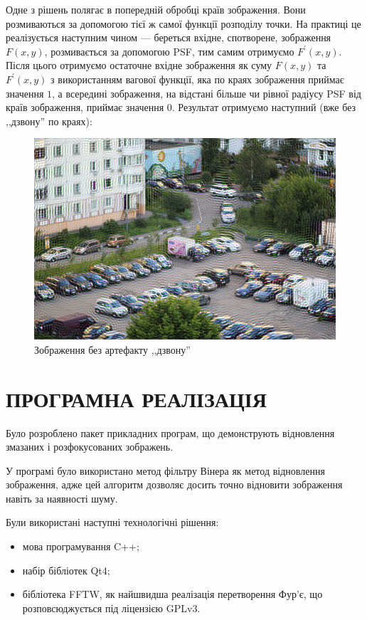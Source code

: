 \documentclass{diploma}
\begin{document}
    Одне з рішень полягає в попередній обробці країв зображення.
    Вони розмиваються за допомогою тієї ж самої функції розподілу точки.
    На практиці це реалізується наступним чином --- береться вхідне,
    спотворене, зображення $F\left( x, y \right)$, розмивається за допомогою
    PSF, тим самим отримуємо $F^\prime\left( x, y \right)$.
    Після цього отримуємо остаточне вхідне зображення як суму $F\left( x, y
    \right)$ та $F^\prime\left( x, y \right)$ з використанням вагової функції,
    яка по краях зображення приймає значення $1$, а всередині зображення,
    на відстані більше чи рівної радіусу PSF від країв зображення, приймає
    значення $0$.
    Результат отримуємо наступний (вже без ,,дзвону'' по краях):
    \begin{figure}[h]
      \centering
      \includegraphics[width=\linewidth]{edge-fixed.jpg}
      \caption{Зображення без артефакту ,,дзвону''}
      \label{fig:edge-fixed}
    \end{figure}

\chapter{ПРОГРАМНА РЕАЛІЗАЦІЯ}
  Було розроблено пакет прикладних програм, що демонструють відновлення
  змазаних і розфокусованих зображень.

  У програмі було використано метод фільтру Вінера як метод відновлення
  зображення, адже цей алгоритм дозволяє досить точно відновити зображення
  навіть за наявності шуму.

  Були використані наступні технологічні рішення:
  \begin{itemize}
    \item мова програмування C++;
    \item набір бібліотек Qt4;
    \item бібліотека FFTW, як найшвидша реалізація перетворення Фур’є, що
      розповсюджується під ліцензією GPLv3.\cite{numerical}
  \end{itemize}
\end{document}
